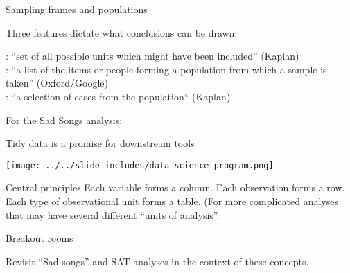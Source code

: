 \documentclass[table]{beamer}\usepackage[]{graphicx}\usepackage[]{color}
\begin{document}
\begin{frame}{Sampling frames and populations}

\begin{block}{Three features dictate what conclusions can be drawn.}

\bi
{}: ``set of all possible units which might have been included'' (Kaplan)\\
: ``a list of the items or people forming a population from which a sample is taken'' (Oxford/Google) \\
: ``a selection of cases from the population`` (Kaplan)
\ei

\end{block}

For the Sad Songs analysis:



\end{frame}



\begin{frame}[fragile]{Tidy data is a promise for downstream tools}


\begin{center}
\texttt{[image: ../../slide-includes/data-science-program.png]}
\end{center}

\vspace{2em}

\begin{block}{Central principles}
\bi
	\myitem Each variable forms a column.
	\myitem Each observation forms a row.
	\myitem Each type of observational unit forms a table. (For more complicated analyses that may have several different ``units of analysis''.
\ei
\end{block}



\end{frame}



\begin{frame}[fragile]{Breakout rooms}


\begin{block}{Revisit ``Sad songs'' and SAT analyses in the context of these concepts.}
\end{block}

\end{frame}
\end{document}
